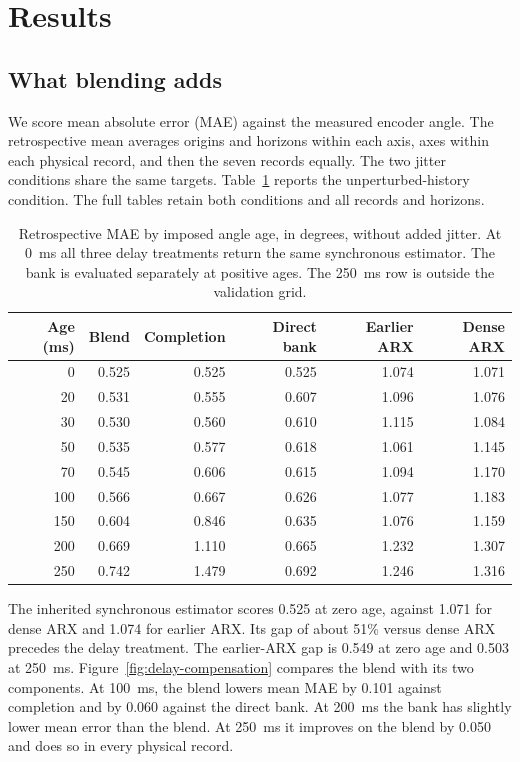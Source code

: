 \section{Results}
\label{sec:results}

\subsection{What blending adds}
\label{sec:incremental}

We score mean absolute error (MAE) against the measured encoder angle. The retrospective mean averages origins and horizons within each axis, axes within each physical record, and then the seven records equally. The two jitter conditions share the same targets. Table~\ref{tab:age-mae} reports the unperturbed-history condition. The full tables retain both conditions and all records and horizons.

\begin{table}[H]
\centering\small
\caption{Retrospective MAE by imposed angle age, in degrees, without added jitter. At 0~ms all three delay treatments return the same synchronous estimator. The bank is evaluated separately at positive ages. The 250~ms row is outside the validation grid.}
\label{tab:age-mae}
\begin{tabular}{@{}rrrrrr@{}}
\toprule
Age (ms) & Blend & Completion & Direct bank & Earlier ARX & Dense ARX \\
\midrule
0 & 0.525 & 0.525 & 0.525 & 1.074 & 1.071 \\
20 & 0.531 & 0.555 & 0.607 & 1.096 & 1.076 \\
30 & 0.530 & 0.560 & 0.610 & 1.115 & 1.084 \\
50 & 0.535 & 0.577 & 0.618 & 1.061 & 1.145 \\
70 & 0.545 & 0.606 & 0.615 & 1.094 & 1.170 \\
100 & 0.566 & 0.667 & 0.626 & 1.077 & 1.183 \\
150 & 0.604 & 0.846 & 0.635 & 1.076 & 1.159 \\
200 & 0.669 & 1.110 & 0.665 & 1.232 & 1.307 \\
250 & 0.742 & 1.479 & 0.692 & 1.246 & 1.316 \\
\bottomrule
\end{tabular}
\end{table}

The inherited synchronous estimator scores 0.525\degs{} at zero age, against 1.071\degs{} for dense ARX and 1.074\degs{} for earlier ARX. Its gap of about 51\% versus dense ARX precedes the delay treatment. The earlier-ARX gap is 0.549\degs{} at zero age and 0.503\degs{} at 250~ms. Figure~\ref{fig:delay-compensation} compares the blend with its two components. At 100~ms, the blend lowers mean MAE by 0.101\degs{} against completion and by 0.060\degs{} against the direct bank. At 200~ms the bank has slightly lower mean error than the blend. At 250~ms it improves on the blend by 0.050\degs{} and does so in every physical record.

